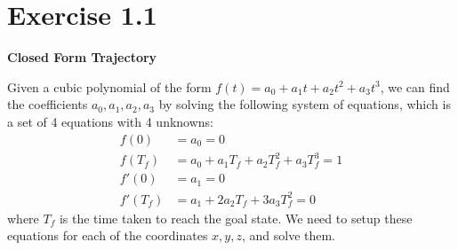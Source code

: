 \section*{Exercise 1.1}

\textbf{Closed Form Trajectory}

Given a cubic polynomial of the form \(f(t) = a_0 + a_1t + a_2t^2 + a_3t^3\), we can find the coefficients \(a_0, a_1, a_2, a_3\) by solving the following system of equations, which is a set of 4 equations with 4 unknowns:
\begin{align*}
    f(0)    & = a_0 = 0                                   \\
    f(T_f)  & = a_0 + a_1 T_f + a_2 T_f^2 + a_3 T_f^3 = 1 \\
    f'(0)   & = a_1 = 0                                   \\
    f'(T_f) & = a_1 + 2 a_2 T_f + 3 a_3 T_f^2 = 0
\end{align*}
where \(T_f\) is the time taken to reach the goal state.
We need to setup these equations for each of the coordinates \(x, y, z\), and solve them.
